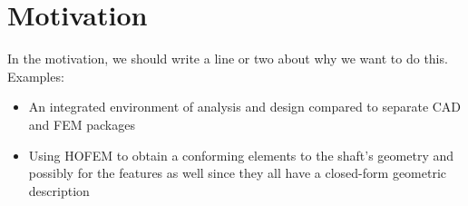 \section{Motivation}
In the motivation, we should write a line or two about why we want to do this. Examples:
\begin{itemize}
\item An integrated environment of analysis and design compared to separate CAD and FEM packages
\item Using HOFEM to obtain a conforming elements to the shaft's geometry and possibly for the features as well since they all have a closed-form geometric description
\end{itemize}

